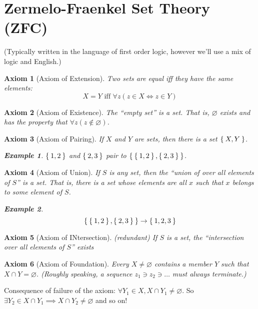 \documentclass[12pt]{amsart}
\theoremstyle{plain}
\newtheorem{AXM}{Axiom}
\theoremstyle{remark}
\theoremstyle{definition}
\newtheorem*{eg}{Example}
\begin{document}
\section*{Zermelo-Fraenkel Set Theory (ZFC)} 
(Typically written in the language of first order logic, however we'll use a mix of logic and English.)

\begin{AXM}[Axiom of Extension]
	Two sets are equal iff they have the same elements:
\begin{equation*}
	X = Y \text{ iff } \forall z(z\in X \iff z\in Y) 
\end{equation*}
\end{AXM}

\begin{AXM}[Axiom of Existence]
	The ``empty set'' is a set. That is, $\varnothing$ exists and has the property that $\forall z(z \notin \varnothing)$.
\end{AXM}

\begin{AXM}[Axiom of Pairing]
	If $X$ and $Y$ are sets, then there is a set $\Set{X, Y}$.
	\begin{eg}
		$\Set{1, 2}$ and $\Set{2, 3}$ pair to $\Set{\Set{1,2}, \Set{2,3}}$.
	\end{eg}
\end{AXM}

\begin{AXM}[Axiom of Union]
	If $S$ is any set, then the ``union of over all elements of $S$'' is a set. That is, there is a set whose elements are all $x$ such that $x$ belongs to some element of $S$.
	\begin{eg}
	\begin{equation*}
		\Set{\Set{1,2},\Set{2,3}} \rightarrow \Set{1,2,3}
	\end{equation*}
	\end{eg}
\end{AXM}

\begin{AXM}[Axiom of INtersection](redundant)
	If $S$ is a set, the ``intersection over all elements of $S$'' exists
\end{AXM}

\begin{AXM}[Axiom of Foundation]
	Every $X \neq \varnothing$ contains a member $Y$ such that $X \cap Y = \varnothing$.
	(Roughly speaking, a sequence $z_1 \ni z_2 \ni \dots$ must always terminate.)
\end{AXM}
Consequence of failure of the axiom:
\newline
$\forall Y_1 \in X, X \cap Y_1 \neq \varnothing$. So $\exists Y_2\in X \cap Y_1 \implies X \cap Y_2 \neq \varnothing$ and so on!
\end{document}
